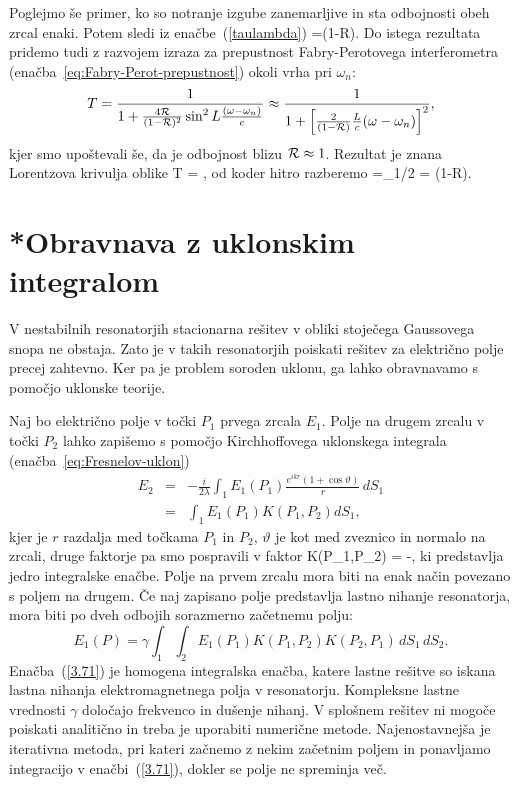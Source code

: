 Poglejmo še primer, ko so notranje izgube zanemarljive in sta odbojnosti obeh zrcal enaki.
Potem sledi iz enačbe~(\ref{taulambda})
\beq
{}=(1-{\cal R}).
\eeq
Do istega rezultata pridemo tudi z razvojem izraza za prepustnost Fabry-Perotovega 
interferometra (enačba~\ref{eq:Fabry-Perot-prepustnost})
okoli vrha pri $\omega_{n}$:
\begin{equation}
T=\frac{1}{1+\frac{4{\cal R}}{(1-{\cal R})^{2}}\sin^{2}L\frac{(\omega-\omega_{n})}{c}}\approx 
\frac{1}{1+\left[\frac{2}{(1-{\cal R})}\frac{L}{c}(\omega-\omega_{n})\right]^{2}},
\label{3.27}
\end{equation}
 kjer smo upoštevali še, da je odbojnost blizu ${\cal R} \approx 1$. Rezultat je znana Lorentzova
 krivulja oblike
 \beq
 T = ,
 \eeq
od koder hitro razberemo 
\beq
{}=\Delta\omega_{1/2} = (1-{\cal R}).
\eeq

\section{*Obravnava z uklonskim integralom}
\label{Resonator_uklon}

V nestabilnih resonatorjih stacionarna rešitev v obliki stoječega
Gaussovega snopa ne obstaja. Zato je v takih resonatorjih poiskati 
rešitev za električno polje precej zahtevno. 
Ker pa je problem soroden uklonu, ga lahko obravnavamo s pomočjo 
uklonske teorije.

Naj bo električno polje v točki $P_{1}$ prvega zrcala $E_{1}$.
Polje na drugem zrcalu v točki $P_2$ lahko zapišemo s pomočjo Kirchhoffovega uklonskega
integrala (enačba~\ref{eq:Fresnelov-uklon})
\begin{eqnarray}
E_{2} & = & -\frac{i}{2\lambda}\int_{1}E_{1}(P_{1})\frac{e^{ikr}(1+\cos\vartheta)}{r}\, dS_{1} \\
 & = & \int_{1}E_{1}(P_{1})K(P_{1},P_{2})dS_{1},
\label{eq:resuklon}
\end{eqnarray}
kjer je $r$ razdalja med točkama $P_{1}$ in $P_{2}$, $\vartheta$
je kot med zveznico in normalo na zrcali, druge faktorje pa smo pospravili v faktor
\beq
K(P_{1},P_{2}) = -,
\label{jedro}
\eeq
ki predstavlja jedro integralske enačbe. Polje na prvem zrcalu mora
biti na enak način povezano s poljem na drugem. Če naj zapisano polje predstavlja lastno nihanje
resonatorja, mora biti po dveh odbojih sorazmerno začetnemu polju:
\begin{equation}
E_{1}(P)=\gamma\int_{1}\int_{2}E_{1}(P_{1})K(P_{1},P_{2})K(P_{2},P_1)\, dS_{1}\, dS_{2}.
\label{3.71}
\end{equation}
Enačba~(\ref{3.71}) je homogena integralska enačba, katere lastne
rešitve so iskana lastna nihanja elektromagnetnega polja v resonatorju.
Kompleksne lastne vrednosti $\gamma$ določajo frekvenco in dušenje
nihanj. V splošnem rešitev ni mogoče poiskati analitično in treba je uporabiti 
numerične metode. Najenostavnejša je iterativna
metoda, pri kateri začnemo z nekim začetnim poljem in ponavljamo integracijo
v enačbi~(\ref{3.71}), dokler se polje ne spreminja več.

